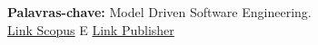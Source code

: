 \documentclass{article}
\begin{document}
\textbf{Palavras-chave:} Model Driven Software Engineering.\\
\href{https://www.scopus.com/record/display.uri?eid=2-s2.0-85061028501&origin=resultslist&sort=plf-f&src=s&st1=%22software+engineering%22&st2=%22Validation%22+or+%22Verification%22+or+%22rastreability%22+or+%22other+applications%22&nlo=&nlr=&nls=&sid=c679c7514cf1dd66899b17b61d8d81ed&sot=b&sdt=b&sl=132&s=%28TITLE-ABS-KEY%28%22software+engineering%22%29+AND+TITLE-ABS-KEY%28%22Validation%22+or+%22Verification%22+or+%22rastreability%22+or+%22other+applications%22%29%29&relpos=50&citeCnt=0&searchTerm=}{Link Scopus} E 
\href{https://ieeexplore.ieee.org/document/8632716/}{Link Publisher}


\end{document}
